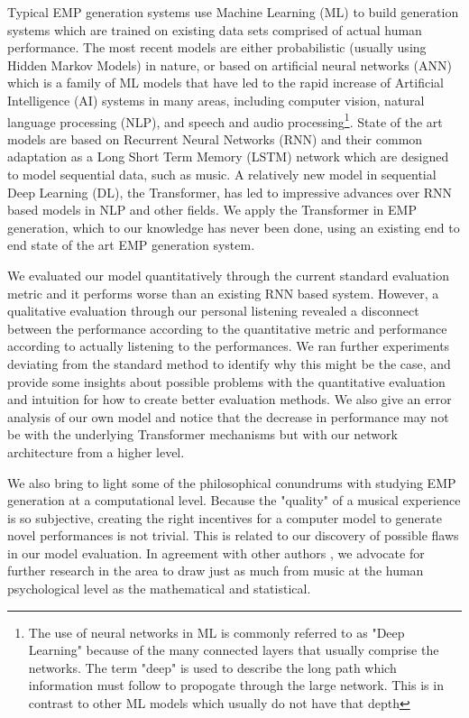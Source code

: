 Typical EMP generation systems use Machine Learning (ML) to build generation systems which are trained on existing data sets comprised of actual human performance. The most recent models are  either probabilistic (usually using Hidden Markov Models) in nature, or based on artificial neural networks (ANN) which is a family of ML models that have led to the rapid increase of Artificial Intelligence (AI) systems in many areas, including computer vision, natural language processing (NLP), and speech and audio processing\cite{goodfellow2016deep}\footnote{The use of neural networks in ML is commonly referred to as "Deep Learning" because of the many connected layers that usually comprise the networks. The term "deep" is used to describe the long path which information must follow to propogate through the large network. This is in contrast to other ML models which usually do not have that depth}. State of the art models are based on Recurrent Neural Networks (RNN) and their common adaptation as a Long Short Term Memory (LSTM) network which are designed to model sequential data, such as music. A relatively new model in sequential Deep Learning (DL), the Transformer, has led to impressive advances over RNN based models in NLP and other fields. We apply the Transformer in EMP generation, which to our knowledge has never been done, using an existing end to end state of the art EMP generation system. 

We evaluated our model quantitatively through the current standard evaluation metric and it performs worse than an existing RNN based system. However, a qualitative evaluation through our personal listening revealed a disconnect between the performance according to the quantitative metric and performance according to actually listening to the performances. We ran further experiments deviating from the standard method to identify why this might be the case, and provide some insights about possible problems with the quantitative evaluation and intuition for how to create better evaluation methods. We also give an error analysis of our own model and notice that the decrease in performance may not be with the underlying Transformer mechanisms but with our network architecture from a higher level. 

We also bring to light some of the philosophical conundrums with studying EMP generation at a computational level. Because the "quality" of a musical experience is so subjective, creating the right incentives for a computer model to generate novel performances is not trivial. This is related to our discovery of possible flaws in our model evaluation. In agreement with other authors \cite{widmer2016getting}, we advocate for further research in the area to draw just as much from music at the human psychological level as the mathematical and statistical. 